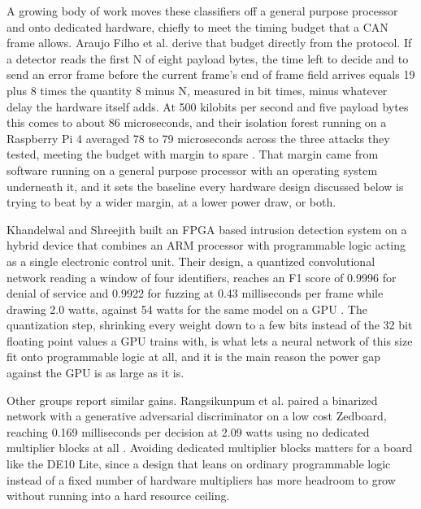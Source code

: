 \documentclass[11pt]{article}
\begin{document}
A growing body of work moves these classifiers off a general purpose processor and onto dedicated hardware, chiefly to meet the timing budget that a CAN frame allows. Araujo Filho et al. derive that budget directly from the protocol. If a detector reads the first N of eight payload bytes, the time left to decide and to send an error frame before the current frame's end of frame field arrives equals 19 plus 8 times the quantity 8 minus N, measured in bit times, minus whatever delay the hardware itself adds. At 500 kilobits per second and five payload bytes this comes to about 86 microseconds, and their isolation forest running on a Raspberry Pi 4 averaged 78 to 79 microseconds across the three attacks they tested, meeting the budget with margin to spare \cite{araujofilho2021}. That margin came from software running on a general purpose processor with an operating system underneath it, and it sets the baseline every hardware design discussed below is trying to beat by a wider margin, at a lower power draw, or both.

Khandelwal and Shreejith built an FPGA based intrusion detection system on a hybrid device that combines an ARM processor with programmable logic acting as a single electronic control unit. Their design, a quantized convolutional network reading a window of four identifiers, reaches an F1 score of 0.9996 for denial of service and 0.9922 for fuzzing at 0.43 milliseconds per frame while drawing 2.0 watts, against 54 watts for the same model on a GPU \cite{khandelwal2022fpl}. The quantization step, shrinking every weight down to a few bits instead of the 32 bit floating point values a GPU trains with, is what lets a neural network of this size fit onto programmable logic at all, and it is the main reason the power gap against the GPU is as large as it is.

Other groups report similar gains. Rangsikunpum et al. paired a binarized network with a generative adversarial discriminator on a low cost Zedboard, reaching 0.169 milliseconds per decision at 2.09 watts using no dedicated multiplier blocks at all \cite{rangsikunpum2024bids}. Avoiding dedicated multiplier blocks matters for a board like the DE10 Lite, since a design that leans on ordinary programmable logic instead of a fixed number of hardware multipliers has more headroom to grow without running into a hard resource ceiling.
\end{document}
